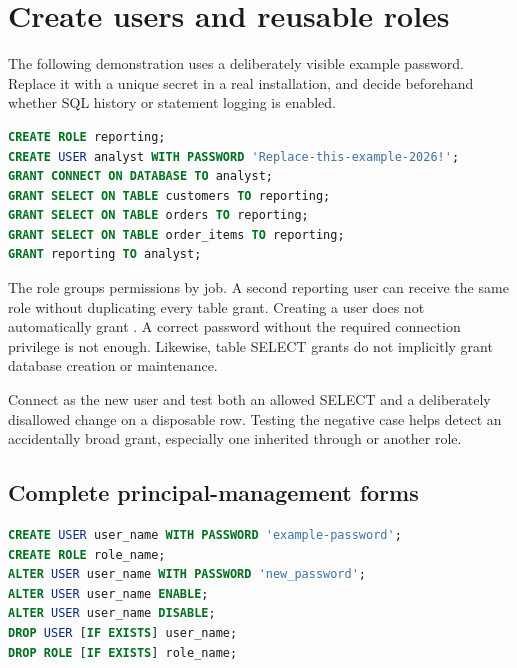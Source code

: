 
\section{Create users and reusable roles}

The following demonstration uses a deliberately visible example password.
Replace it with a unique secret in a real installation, and decide beforehand
whether SQL history or statement logging is enabled.

\begin{lstlisting}[language=SQL]
CREATE ROLE reporting;
CREATE USER analyst WITH PASSWORD 'Replace-this-example-2026!';
GRANT CONNECT ON DATABASE TO analyst;
GRANT SELECT ON TABLE customers TO reporting;
GRANT SELECT ON TABLE orders TO reporting;
GRANT SELECT ON TABLE order_items TO reporting;
GRANT reporting TO analyst;
\end{lstlisting}

The role groups permissions by job. A second reporting user can receive the
same role without duplicating every table grant. Creating a user does not
automatically grant . A correct password without the required
connection privilege is not enough. Likewise, table SELECT grants do not
implicitly grant database creation or maintenance.

Connect as the new user and test both an allowed SELECT and a deliberately
disallowed change on a disposable row. Testing the negative case helps detect
an accidentally broad grant, especially one inherited through 
or another role.

\subsection{Complete principal-management forms}

\begin{lstlisting}[language=SQL]
CREATE USER user_name WITH PASSWORD 'example-password';
CREATE ROLE role_name;
ALTER USER user_name WITH PASSWORD 'new_password';
ALTER USER user_name ENABLE;
ALTER USER user_name DISABLE;
DROP USER [IF EXISTS] user_name;
DROP ROLE [IF EXISTS] role_name;
\end{lstlisting}

